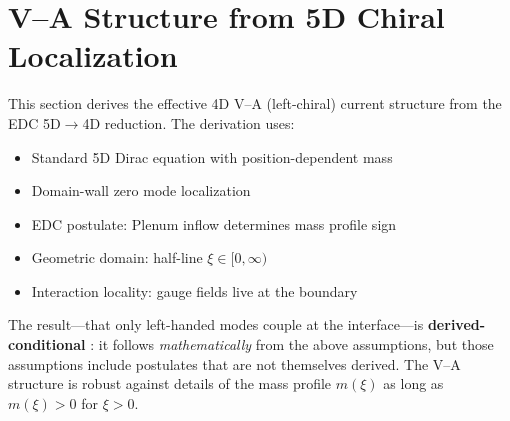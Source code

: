 
\chapter{V--A Structure from 5D Chiral Localization}
\label{ch:va_structure}

\begin{tcolorbox}[edcGuardrail, title=\textbf{Epistemic Status}]
This section derives the effective 4D V–A (left-chiral) current structure
from the EDC 5D$\to$4D reduction. The derivation uses:
\begin{itemize}[nosep]
    \item Standard 5D Dirac equation with position-dependent mass \tagBL{}
    \item Domain-wall zero mode localization~\cite{JackiwRebbi1976,Kaplan1992} \tagBL{}
    \item EDC postulate: Plenum inflow determines mass profile sign \tagP{}
    \item Geometric domain: half-line $\xi \in [0, \infty)$ \tagP{}
    \item Interaction locality: gauge fields live at the boundary \tagP{}
\end{itemize}
The result---that only left-handed modes couple at the interface---is
\textbf{derived-conditional} \tagDc{}: it follows \emph{mathematically} from
the above assumptions, but those assumptions include postulates \tagP{} that
are not themselves derived. The V--A structure is robust against details of
the mass profile $m(\xi)$ as long as $m(\xi) > 0$ for $\xi > 0$.
\end{tcolorbox}

